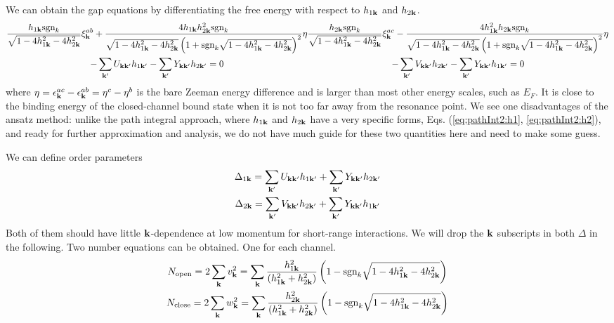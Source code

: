 We can obtain the gap equations by differentiating the free energy with respect to $h_{1\mathbf{k}}$ and $h_{2\mathbf{k}}$.
\begin{subequations}\label{eq:20100909:fullgap}
\begin{multline}
\frac{h_{1\vk}\sgn_k}{\sqrt{1-4 h_{1\vk}^2-4 h_{2\vk}^2}} \xi^{ab}_{\vk}+\frac{4 h_{1\vk} h_{2\vk}^2\sgn_{k}}{\sqrt{1-4 h_{1\vk}^2-4 h_{2\vk}^2} \left(1+\sgn_{k}\sqrt{1-4 h_{1\vk}^2-4 h_{2\vk}^2}\right)^2}\eta\\
-\sum_{\vk'}U_{\vk\vk'}h_{1\vk'}-\sum_{\vk'}Y_{\vk\vk'}h_{2\vk'}=0
\label{eq:20100909:fullgapa}
\end{multline}
\begin{multline}
\frac{h_{2\vk}\sgn_k}{\sqrt{1-4 h_{1\vk}^2-4 h_{2\vk}^2}} \xi^{ac}_{\vk}-\frac{4 h_{1\vk}^{2} h_{2\vk}\sgn_{k}}{\sqrt{1-4 h_{1\vk}^2-4 h_{2\vk}^2} \left(1+\sgn_{k}\sqrt{1-4 h_{1\vk}^2-4 h_{2\vk}^2}\right)^2}\eta\\
-\sum_{\vk'}V_{\vk\vk'}h_{2\vk'}-\sum_{\vk'}Y_{\vk\vk'}h_{1\vk'}=0
\label{eq:20100909:fullgapb}
\end{multline}
\end{subequations}
where $\eta=\epsilon^{ac}_{\mathbf{k}}-\epsilon^{ab}_{\mathbf{k}}=\eta^{c}-\eta^{b}$ is the bare Zeeman energy difference and is larger than most other energy scales, such as $E_{F}$.  It is close to  the binding energy of the closed-channel bound state when it is not too far away from the resonance point.   We see one  disadvantages of the ansatz method: unlike the path integral approach, where $h_{1\mathbf{k}}$ and $h_{2\mathbf{k}}$ have a very specific forms, Eqs. (\ref{eq:pathInt2:h1}, \ref{eq:pathInt2:h2}), and ready for further approximation and analysis,  we do not have much guide for these two quantities here and need to make some guess.  

We can define order parameters
\begin{gather}
\Delta_{1\mathbf{k}}=\sum_{\mathbf{k}'}U_{\mathbf{k}\mathbf{k}'}h_{1\mathbf{k}'}+\sum_{\mathbf{k}'}Y_{\mathbf{k}\mathbf{k}'}h_{2\mathbf{k}'}\\
\Delta_{2\mathbf{k}}=\sum_{\mathbf{k}'}V_{\mathbf{k}\mathbf{k}'}h_{2\mathbf{k}'}+\sum_{\mathbf{k}'}Y_{\mathbf{k}\mathbf{k}'}h_{1\mathbf{k}'}
\end{gather}
Both of them should have little $\mathbf{k}$-dependence at low momentum for short-range interactions.  We will drop the $\mathbf{k}$ subscripts in both $\Delta$ in the following. 
Two number equations can be obtained.  One for each channel.
\begin{subequations}\label{eq:20100909:number}
\begin{gather}
N_{\text{open}}=2\sum_{\mathbf{k}}v_{\mathbf{k}}^{2}
	=\sum_{\mathbf{k}}\frac{ h_{1\mathbf{k}}^2}{( h_{1\mathbf{k}}^2+ h_{2\mathbf{k}}^2)} \left(1-\text{sgn}_{k}\sqrt{1-4 h_{1\mathbf{k}}^2-4 h_{2\mathbf{k}}^2}\right)
	\label{eq:meanfield:opennum}\\
N_{\text{close}}=2\sum_{\mathbf{k}}w_{\mathbf{k}}^{2}
	=\sum_{\mathbf{k}}\frac{ h_{2\mathbf{k}}^2}{( h_{1\mathbf{k}}^2+ h_{2\mathbf{k}}^2)} \left(1-\text{sgn}_{k}\sqrt{1-4 h_{1\mathbf{k}}^2-4 h_{2\mathbf{k}}^2}\right)
\end{gather} 
\end{subequations}


